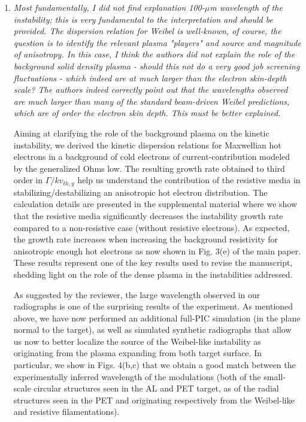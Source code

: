 \documentclass{article}
\begin{document}
\begin{enumerate}
\item \textit{Most fundamentally, I did not find explanation 100-$\mu$m wavelength of the instability; this is very fundamental to the interpretation and should be provided. The dispersion relation for Weibel is well-known, of course, the question is to identify the relevant plasma "players" and source and magnitude of anisotropy. In this case, I think the authors did not explain the role of the background solid density plasma - should this not do a very good job screening fluctuations - which indeed are at much larger than the electron skin-depth scale? The authors indeed correctly point out that the wavelengths observed are much larger than many of the standard beam-driven Weibel predictions, which are of order the electron skin depth. This must be better explained. }

Aiming at clarifying the role of the background plasma on the kinetic instability,
we derived the kinetic dispersion relations for Maxwellian hot electrons in a background of cold electrons of current-contribution modeled by the generalized Ohms low. 
The resulting growth rate obtained to third order in $\Gamma/k v_{th,y}$ help us understand the contribution of the resistive media in stabilizing/destabilizing an anisotropic hot electron distribution. 
The calculation details are presented in the supplemental material where we show that the
resistive media significantly decreases the instability growth rate compared to a non-resistive case (without resistive electrons).
As expected, the growth rate increases when increasing the background resistivity for anisotropic enough hot electrons as now shown in Fig. 3(e) of the main paper.
These results represent one of the key results used to  revise the manuscript,  shedding light on the role of the dense plasma in the instabilities addressed.

As suggested by the reviewer,   the large wavelength observed in our radiographs is one of the surprising results of the  experiment. As mentioned above, we have now performed an additional full-PIC simulation (in the plane normal to the target), as well as simulated synthetic radiographs that allow us now to better localize the source of the Weibel-like instability as originating from the plasma expanding from both target surface. In particular, we show in Figs. 4(b,c) that we obtain a good match between the experimentally inferred wavelength of the modulations (both of the small-scale circular structures seen in the AL and PET target, as of the radial structures seen in the PET and originating respectively from the Weibel-like and resistive filamentations). 


\end{enumerate}
\end{document}
